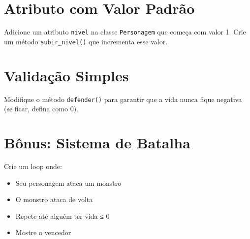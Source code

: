 \section{Atributo com Valor Padrão}
Adicione um atributo \texttt{nivel} na classe \texttt{Personagem} que começa com valor 1. Crie um método \texttt{subir\_nivel()} que incrementa esse valor.

\section{Validação Simples}
Modifique o método \texttt{defender()} para garantir que a vida nunca fique negativa (se ficar, defina como 0).

\section{Bônus: Sistema de Batalha}
Crie um loop onde:
\begin{itemize}
\item Seu personagem ataca um monstro
\item O monstro ataca de volta
\item Repete até alguém ter vida ≤ 0
\item Mostre o vencedor
\end{itemize}

